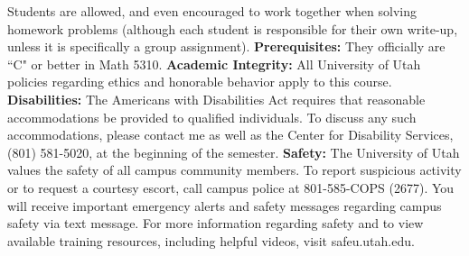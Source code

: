 \documentclass[oneside,10pt]{amsart}
\begin{document}
Students are allowed, and even encouraged to work together when solving homework problems (although each student is responsible for their own write-up, unless it is specifically a group assignment).
\vskip 8pt
\hskip -12pt
{\bf Prerequisites: }  They officially are ``C" or better in Math 5310.
\vskip 8pt
\hskip -12pt
{\bf Academic Integrity: } All University of Utah policies regarding ethics and honorable behavior apply to
this course.
\vskip 8pt
\hskip -12pt
{\bf Disabilities: } The Americans with Disabilities Act requires that reasonable accommodations be provided to qualified individuals. To discuss any such accommodations, please contact me as well as the Center for Disability Services, (801) 581-5020, at the beginning of the semester.
\vskip 8pt
\noindent
{\bf Safety:}  The University of Utah values the safety of all campus community members. To report suspicious activity or to request a courtesy escort, call campus police at 801-585-COPS (2677). You will receive important emergency alerts and safety messages regarding campus safety via text message. For more information regarding safety and to view available training resources, including helpful videos, visit safeu.utah.edu.
\end{document}
